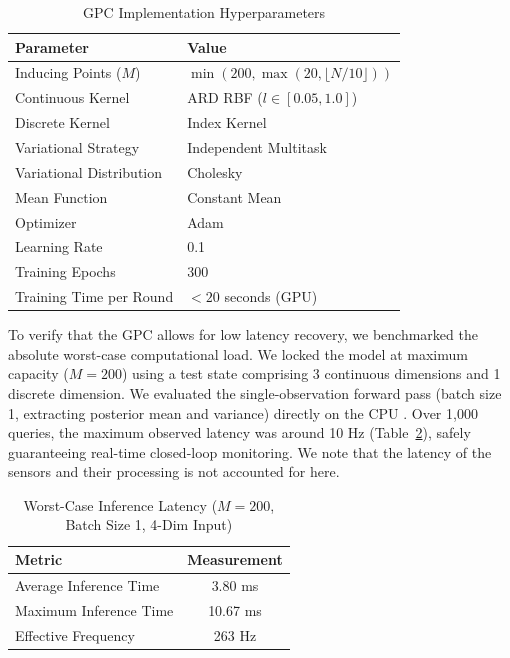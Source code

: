 \begin{table}[h]
\centering
\caption{GPC Implementation Hyperparameters}
\label{tab:gpc_hyperparams}
\begin{tabular}{@{}ll@{}}
\toprule
\textbf{Parameter} & \textbf{Value} \\ \midrule
Inducing Points ($M$) & $\min(200, \max(20, \lfloor N/10 \rfloor))$ \\
Continuous Kernel & ARD RBF ($l \in [0.05, 1.0]$) \\
Discrete Kernel & Index Kernel \\
Variational Strategy & Independent Multitask \\
Variational Distribution & Cholesky \\
Mean Function & Constant Mean \\
Optimizer & Adam \\
Learning Rate & 0.1 \\
Training Epochs & 300 \\ 
Training Time per Round & $< 20$ seconds (GPU) \\ \bottomrule
\end{tabular}
\vspace{-2mm}
\end{table}
To verify that the GPC allows for low latency recovery, we benchmarked the absolute worst-case computational load. We locked the model at maximum capacity ($M = 200$) using a test state comprising 3 continuous dimensions and 1 discrete dimension. We evaluated the single-observation forward pass (batch size 1, extracting posterior mean and variance) directly on the CPU . Over 1,000 queries, the maximum observed latency was around 10 Hz (Table~\ref{tab:latency_results}), safely guaranteeing real-time closed-loop monitoring. We note that the latency of the sensors and their processing is not accounted for here.

\begin{table}[h]
\centering
\caption{Worst-Case Inference Latency ($M=200$, Batch Size 1, 4-Dim Input)}
\label{tab:latency_results}
\begin{tabular}{@{}lc@{}}
\toprule
\textbf{Metric} & \textbf{Measurement} \\ \midrule
Average Inference Time & 3.80 ms \\
Maximum Inference Time & 10.67 ms \\
Effective Frequency & 263 Hz \\ \bottomrule
\end{tabular}
\end{table}

